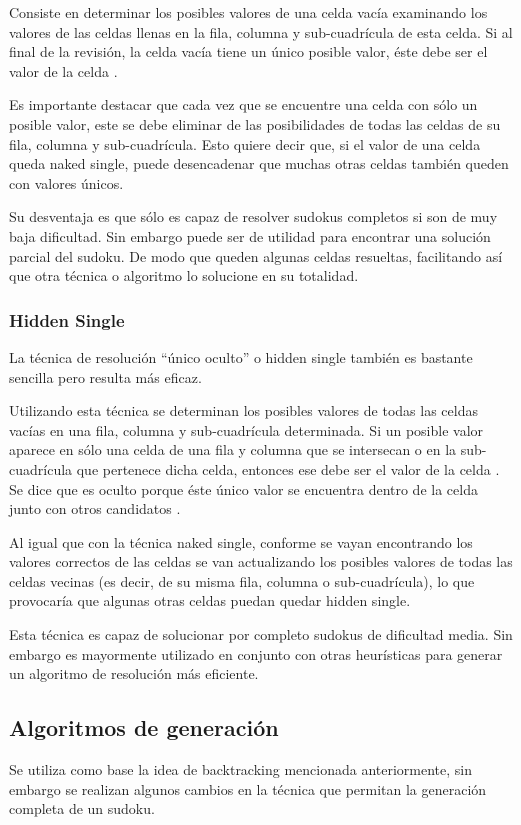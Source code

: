 \documentclass[conference]{IEEEtran}
\begin{document}
Consiste en determinar los posibles valores de una celda vacía examinando los valores de las celdas llenas en la fila, columna y sub-cuadrícula de esta celda. Si al final de la revisión, la celda vacía tiene un único posible valor, éste debe ser el valor de la celda \cite{nakedSolving}.

Es importante destacar que cada vez que se encuentre una celda con sólo un posible valor, este se debe eliminar de las posibilidades de todas las celdas de su fila, columna y sub-cuadrícula. Esto quiere decir que, si el valor de una celda queda naked single, puede desencadenar que muchas otras celdas también queden con valores únicos.

Su desventaja es que sólo es capaz de resolver sudokus completos si son de muy baja dificultad. Sin embargo puede ser de utilidad para encontrar una solución parcial del sudoku. De modo que queden algunas celdas resueltas, facilitando así que otra técnica o algoritmo lo solucione en su totalidad.

\subsubsection{Hidden Single}
La técnica de resolución “único oculto” o hidden single también es bastante sencilla pero resulta más eficaz.

Utilizando esta técnica se determinan los posibles valores de todas las celdas vacías en una fila, columna y sub-cuadrícula determinada. Si un posible valor aparece en sólo una celda de una fila y columna que se intersecan o en la sub-cuadrícula que pertenece dicha celda, entonces ese debe ser el valor de la celda \cite{hiddenSolving}. Se dice que es oculto porque éste único valor se encuentra dentro de la celda junto con otros candidatos \cite{individual}.

Al igual que con la técnica naked single, conforme se vayan encontrando los valores correctos de las celdas se van actualizando los posibles valores de todas las celdas vecinas (es decir, de su misma fila, columna o sub-cuadrícula), lo que provocaría que algunas otras celdas puedan quedar hidden single.

Esta técnica es capaz de solucionar por completo sudokus de dificultad media. Sin embargo es mayormente utilizado en conjunto con otras heurísticas para generar un algoritmo de resolución más eficiente.

\subsection{Algoritmos de generación}
Se utiliza como base la idea de backtracking mencionada anteriormente, sin embargo se realizan algunos cambios en la técnica que permitan la generación completa de un sudoku.
\end{document}
